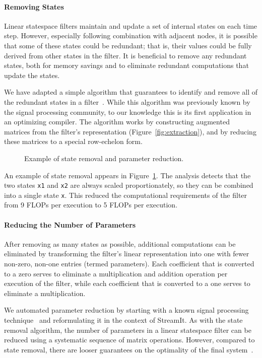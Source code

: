 \paragraph*{Removing States}  Linear statespace filters maintain and
update a set of internal states on each time step.  However,
especially following combination with adjacent nodes, it is possible
that some of these states could be redundant; that is, their values
could be fully derived from other states in the filter.  It is
beneficial to remove any redundant states, both for memory savings and
to eliminate redundant computations that update the states.

We have adapted a simple algorithm that guarantees to identify and
remove all of the redundant states in a filter~\cite{Mayne}.  While
this algorithm was previously known by the signal processing
community, to our knowledge this is its first application in an
optimizing compiler.  The algorithm works by constructing augmented
matrices from the filter's representation
(Figure~\ref{fig:extraction}), and by reducing these matrices to a
special row-echelon form.

\begin{figure}[t]
\centering
{}
\caption{Example of state removal and parameter reduction.\protect\label{fig:states}}
\end{figure}

An example of state removal appears in Figure~\ref{fig:states}.  The
analysis detects that the two states {\tt x1} and {\tt x2} are always
scaled proportionately, so they can be combined into a single state
{\tt x}.  This reduced the computational requirements of the filter
from 9 FLOPs per execution to 5 FLOPs per execution.

\paragraph*{Reducing the Number of Parameters}  After removing as 
many states as possible, additional computations can be eliminated by
transforming the filter's linear representation into one with fewer
non-zero, non-one entries (termed parameters).  Each coefficient that
is converted to a zero serves to eliminate a multiplication and
addition operation per execution of the filter, while each coefficient
that is converted to a one serves to eliminate a multiplication.  

We automated parameter reduction by starting with a known signal
processing technique~\cite{Ackermann/Bucy} and reformulating it in the
context of StreamIt.  As with the state removal algorithm, the number
of parameters in a linear statespace filter can be reduced using a
systematic sequence of matrix operations.  However, compared to state
removal, there are looser guarantees on the optimality of the final
system~\cite{agrawal-cases05}.

